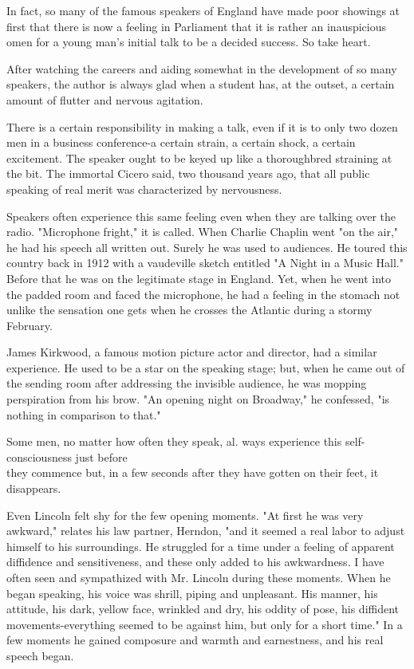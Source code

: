 \documentclass[10pt]{article}
\begin{document}
In fact, so many of the famous speakers of England have made poor showings at first that there is now a feeling in Parliament that it is rather an inauspicious omen for a young man's initial talk to be a decided success. So take heart.

After watching the careers and aiding somewhat in the development of so many speakers, the author is always glad when a student has, at the outset, a certain amount of flutter and nervous agitation.

There is a certain responsibility in making a talk, even if it is to only two dozen men in a business conference-a certain strain, a certain shock, a certain excitement. The speaker ought to be keyed up like a thoroughbred straining at the bit. The immortal Cicero said, two thousand years ago, that all public speaking of real merit was characterized by nervousness.

Speakers often experience this same feeling even when they are talking over the radio. "Microphone fright," it is called. When Charlie Chaplin went "on the air," he had his speech all written out. Surely he was used to audiences. He toured this country back in 1912 with a vaudeville sketch entitled "A Night in a Music Hall." Before that he was on the legitimate stage in England. Yet, when he went into the padded room and faced the microphone, he had a feeling in the stomach not unlike the sensation one gets when he crosses the Atlantic during a stormy February.

James Kirkwood, a famous motion picture actor and director, had a similar experience. He used to be a star on the speaking stage; but, when he came out of the sending room after addressing the invisible audience, he was mopping perspiration from his brow. "An opening night on Broadway," he confessed, "is nothing in comparison to that."

Some men, no matter how often they speak, al. ways experience this self-consciousness just before\\
they commence but, in a few seconds after they have gotten on their feet, it disappears.

Even Lincoln felt shy for the few opening moments. "At first he was very awkward," relates his law partner, Herndon, "and it seemed a real labor to adjust himself to his surroundings. He struggled for a time under a feeling of apparent diffidence and sensitiveness, and these only added to his awkwardness. I have often seen and sympathized with Mr. Lincoln during these moments. When he began speaking, his voice was shrill, piping and unpleasant. His manner, his attitude, his dark, yellow face, wrinkled and dry, his oddity of pose, his diffident movements-everything seemed to be against him, but only for a short time." In a few moments he gained composure and warmth and earnestness, and his real speech began.
\end{document}
